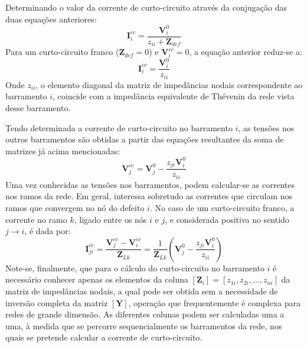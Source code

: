 \noindent Determinando o valor da corrente de curto-circuito através da conjugação das duas equações anteriores:
$$
\mathbf{I}_i^{cc} = \frac{\mathbf{V}^0_i}{z_{ii} + \mathbf{Z}_{def}}
$$
Para um curto-circuito franco ($\mathbf{Z}_{def} = 0$) e $\mathbf{V}^{cc}_i = 0$, a equação anterior reduz-se a:
$$
\mathbf{I}_i^{cc} = \frac{\mathbf{V}^0_i}{z_{ii}}
$$
Onde $z_{ii}$, o elemento diagonal da matriz de impedâncias nodais correspondente ao barramento $i$, coincide com a impedância equivalente de Thévenin da rede vista desse barramento.

Tendo determinada a corrente de curto-circuito no barramento $i$, as tensões nos outros barramentos são obtidas a partir das equações resultantes da soma de matrizes já acima mencionadas:
$$
\mathbf{V}^{cc}_j = \mathbf{V}^0_j - \frac{z_{ji} \mathbf{V}^0_i}{z_{ii}}
$$
Uma vez conhecidas as tensões nos barramentos, podem calcular-se as correntes nos ramos da rede. Em geral, interessa sobretudo as correntes que circulam nos ramos que convergem no nó do defeito $i$. No caso de um curto-circuito franco, a corrente no ramo $k$, ligado entre os nós $i$ e $j$, e considerada positiva no sentido $j \to i$, é dada por:
$$
    \mathbf{I}^{cc}_{ji} = \frac{\mathbf{V}^{cc}_j - \mathbf{V}^{cc}_i}{\mathbf{Z}_{Lk}} = \frac{1}{\mathbf{Z}_{Lk}} \left( \mathbf{V}^0_j - \frac{z_{ji} \mathbf{V}^0_i}{z_{ii}} \right)
$$
Note-se, finalmente, que para o cálculo do curto-circuito no barramento $i$ é necessário conhecer apenas os elementos da coluna $[\mathbf{Z}_i] = \left[ z_{1i}, z_{2i}, \dots, z_{ni} \right]$ da matriz de impedâncias nodais, a qual pode ser obtida sem a necessidade de inversão completa da matriz $[\mathbf{Y}]$, operação que frequentemente é complexa para redes de grande dimensão. As diferentes colunas podem ser calculadas uma a uma, à medida que se percorre sequencialmente os barramentos da rede, nos quais se pretende calcular a corrente de curto-circuito.

